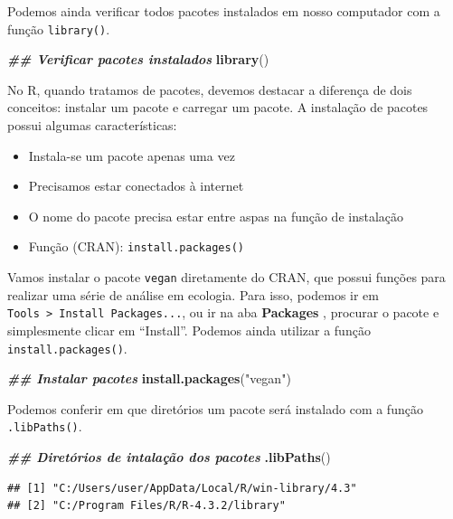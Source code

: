 \documentclass[
]{article}
\newenvironment{Shaded}{\begin{snugshade}}{\end{snugshade}}
\newcommand{\DocumentationTok}[1]{\textcolor[rgb]{0.56,0.35,0.01}{\textbf{\textit{#1}}}}
\newcommand{\FunctionTok}[1]{\textcolor[rgb]{0.13,0.29,0.53}{\textbf{#1}}}
\newcommand{\NormalTok}[1]{#1}
\newcommand{\StringTok}[1]{\textcolor[rgb]{0.31,0.60,0.02}{#1}}
\providecommand{\tightlist}{%
  \setlength{\itemsep}{0pt}\setlength{\parskip}{0pt}}
\begin{document}
Podemos ainda verificar todos pacotes instalados em nosso computador com a função \texttt{library()}.

\begin{Shaded}
\begin{Highlighting}[]
\DocumentationTok{\#\# Verificar pacotes instalados}
\FunctionTok{library}\NormalTok{()}
\end{Highlighting}
\end{Shaded}

No R, quando tratamos de pacotes, devemos destacar a diferença de dois conceitos: instalar um pacote e carregar um pacote. A instalação de pacotes possui algumas características:

\begin{itemize}
\tightlist
\item
  Instala-se um pacote apenas uma vez
\item
  Precisamos estar conectados à internet
\item
  O nome do pacote precisa estar entre aspas na função de instalação
\item
  Função (CRAN): \texttt{install.packages()}
\end{itemize}

Vamos instalar o pacote \texttt{vegan} diretamente do CRAN, que possui funções para realizar uma série de análise em ecologia. Para isso, podemos ir em \texttt{Tools\ \textgreater{}\ Install\ Packages...}, ou ir na aba \textbf{Packages} , procurar o pacote e simplesmente clicar em ``Install''. Podemos ainda utilizar a função \texttt{install.packages()}.

\begin{Shaded}
\begin{Highlighting}[]
\DocumentationTok{\#\# Instalar pacotes}
\FunctionTok{install.packages}\NormalTok{(}\StringTok{"vegan"}\NormalTok{)}
\end{Highlighting}
\end{Shaded}

Podemos conferir em que diretórios um pacote será instalado com a função \texttt{.libPaths()}.

\begin{Shaded}
\begin{Highlighting}[]
\DocumentationTok{\#\# Diretórios de intalação dos pacotes}
\FunctionTok{.libPaths}\NormalTok{()}
\end{Highlighting}
\end{Shaded}

\begin{verbatim}
## [1] "C:/Users/user/AppData/Local/R/win-library/4.3"
## [2] "C:/Program Files/R/R-4.3.2/library"
\end{verbatim}
\end{document}
